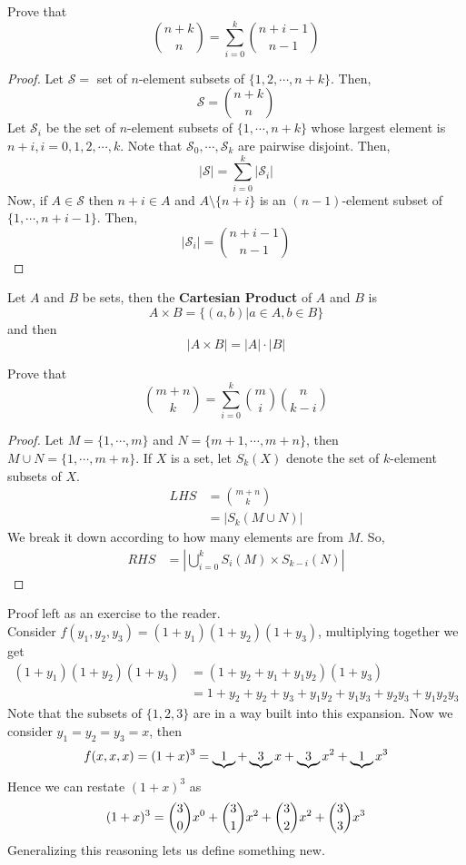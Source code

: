 \documentclass[english, 11pt]{article}
\begin{document}
  \begin{exmp}
    Prove that
    $${n + k \choose n} = \sum_{i=0}^k {n+i-1\choose n-1}$$
  \end{exmp}

  \begin{proof}
    Let $\mathscr{S}  =$ set of $n$-element subsets of $\{ 1,2,\cdots,n+k \}$. Then,
    \[ \mathscr{S} = {n+k\choose n} \]
    Let $\mathscr{S}_i$ be the set of $n$-element subsets of $\{1,\cdots,n+k\}$ whose largest element is $n+i, i = 0,1,2,\cdots,k$. Note that $\mathscr{S} _0, \cdots, \mathscr{S} _k$ are pairwise disjoint. Then,
    \[ |\mathscr{S} | = \sum_{i=0}^k |\mathscr{S}_i| \]
    Now, if $A \in \mathscr{S}$ then $n + i \in A$ and $A \setminus \{ n + i \}$ is an $(n-1)$-element subset of $\{1,\cdots,n+i-1\}$. Then,
    $$|\mathscr{S} _i| = {n+i-1\choose n-1}$$
  \end{proof}

  \begin{defn}\label{cartesian product}
    Let $A$ and $B$ be sets, then the \textbf{Cartesian Product} of $A$ and $B$ is
    \[ A \times B = \{ (a,b) | a \in A, b \in B \} \]
    and then
    \[ |A \times B| = |A|\cdot|B| \]
  \end{defn}

  \begin{exmp}
    Prove that
    \[ {m + n \choose k} = \sum_{i=0}^k {m \choose i} {n \choose k - i} \]
  \end{exmp}

  \begin{proof}
  Let $M = \{ 1,\cdots, m\}$ and $N = \{ m+1, \cdots, m + n\}$, then $M\cup N = \{ 1, \cdots, m+n\}$. If $X$ is a set, let $S_k(X)$ denote the set of $k$-element subsets of $X$.
    \begin{align*}
      LHS & = {m + n \choose k} \\
          & = |S_k(M\cup N)|
    \end{align*}
  We break it down according to how many elements are from $M$.
  So,
  \begin{align*}
      RHS & = \left| \bigcup_{i=0}^k S_i(M) \times S_{k-i}(N) \right|
    \end{align*}
  \end{proof}

Proof left as an exercise to the reader. \\

Consider $f(y_1,y_2,y_3) = (1+y_1)(1+y_2)(1+y_3)$, multiplying together we get
\begin{align*}
  (1+y_1)(1+y_2)(1+y_3) & = (1+y_2+y_1+y_1y_2)(1+y_3) \\
  & = 1 + y_2 + y_2 + y_3 + y_1y_2 + y_1y_3 + y_2y_3 + y_1y_2y_3
\end{align*}
Note that the subsets of $\{ 1, 2, 3 \}$ are in a way built into this expansion. Now we consider $y_1=y_2=y_3=x$, then
\[ f(x,x,x) = (1+x)^3 = \underbrace{1} + \underbrace{3}x + \underbrace{3}x^2 + \underbrace{1}x^3 \]
Hence we can restate $(1+x)^3$ as
\[ (1+x)^3 = {3 \choose 0}x^0 + {3 \choose 1}x^2 + {3 \choose 2}x^2 + {3 \choose 3}x^3 \]
Generalizing this reasoning lets us define something new.
\end{document}
